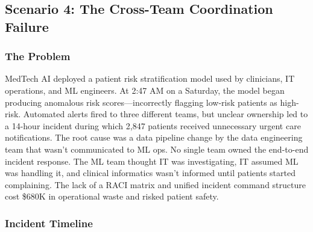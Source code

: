 \subsection{Scenario 4: The Cross-Team Coordination Failure}

\subsubsection{The Problem}

MedTech AI deployed a patient risk stratification model used by clinicians, IT operations, and ML engineers. At 2:47 AM on a Saturday, the model began producing anomalous risk scores---incorrectly flagging low-risk patients as high-risk. Automated alerts fired to three different teams, but unclear ownership led to a 14-hour incident during which 2,847 patients received unnecessary urgent care notifications. The root cause was a data pipeline change by the data engineering team that wasn't communicated to ML ops. No single team owned the end-to-end incident response. The ML team thought IT was investigating, IT assumed ML was handling it, and clinical informatics wasn't informed until patients started complaining. The lack of a RACI matrix and unified incident command structure cost \$680K in operational waste and risked patient safety.

\subsubsection{Incident Timeline}

